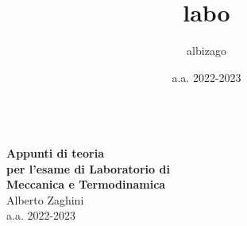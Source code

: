 \documentclass[10pt, oneside]{book}
\title{labo}
\author{albizago}
\date{a.a. 2022-2023}
\begin{document}
\makeatletter
\begin{titlepage}
\vspace{-2.1cm}
\hspace{0cm}
\vfill
\, \\\larger[20]\textsf{\textbf{Appunti di teoria \\per l'esame di Laboratorio di \\Meccanica e Termodinamica}}
\\\smaller[2]Alberto Zaghini
\\a.a. 2022-2023
\\~\\ \larger[20]\,\,
\\~\\ \,\,

\vfill
\hspace{0cm}
\end{titlepage}
\makeatother
\end{document}
